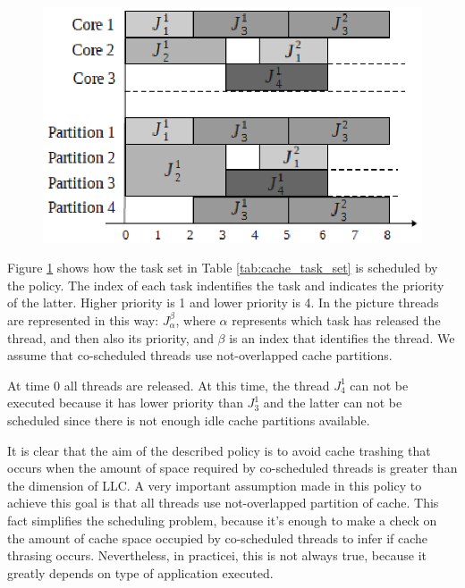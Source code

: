 \begin{description}
\begin{figure}[htbp]
\centering
{
\includegraphics[width=\widefigure]{images/schedule.eps}
}
\caption{}
\label{fig:sched_example}
\end{figure}

Figure \ref{fig:sched_example} shows how the task set in Table \ref{tab:cache_task_set} is scheduled by the policy. The index of each task 
indentifies the task and indicates the priority of the latter. Higher priority is 1 and lower priority is 4. In the picture threads are represented in this 
way: $J_{\alpha}^\beta$, where $\alpha$ represents which task has released the thread, and then also its priority, and $\beta$ is an index that identifies 
the thread. We assume that co-scheduled threads use not-overlapped cache partitions.

At time 0 all threads are released. At this time, the thread $J_{4}^1$ can not be executed because it has lower priority than $J_{3}^1$ and the latter can 
not be scheduled since there is not enough idle cache partitions available.

It is clear that the aim of the described policy is to avoid cache trashing that occurs when the amount of space required by co-scheduled threads is greater 
than the dimension of LLC. A very important assumption made in this policy to achieve this goal is that all threads use not-overlapped 
partition of cache. This fact simplifies the scheduling problem, because it's enough to make a check on the amount of cache space occupied by co-scheduled 
threads to infer if cache thrasing occurs. Nevertheless, in practicei, this is not always true, because it greatly depends on type of application executed.



\end{description}
